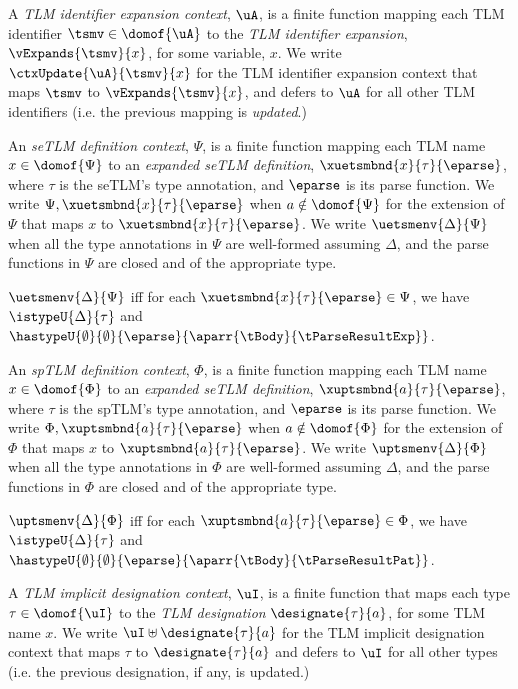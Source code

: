 A \emph{TLM identifier expansion context}, $\uA$, is a finite function mapping each TLM identifier $\tsmv \in \domof{\uA}$ to the \emph{TLM identifier expansion}, $\vExpands{\tsmv}{x}$, for some variable, $x$. We write $\ctxUpdate{\uA}{\tsmv}{x}$ for the TLM identifier expansion context that maps $\tsmv$ to $\vExpands{\tsmv}{x}$, and defers to $\uA$ for all other TLM identifiers (i.e. the previous mapping is \emph{updated}.)

An \emph{seTLM definition context}, $\Psi$, is a finite function mapping each TLM name $x \in \domof{\Psi}$ to an \emph{expanded seTLM definition}, $\xuetsmbnd{x}{\tau}{\eparse}$, where $\tau$ is the seTLM's type annotation, and $\eparse$ is its parse function. We write $\Psi, \xuetsmbnd{x}{\tau}{\eparse}$ when $a \notin \domof{\Psi}$ for the extension of $\Psi$ that maps $x$ to $\xuetsmbnd{x}{\tau}{\eparse}$. We write $\uetsmenv{\Delta}{\Psi}$  when all the type annotations in $\Psi$ are well-formed assuming $\Delta$, and the parse functions in $\Psi$ are closed and of the appropriate type.

\begin{definition}\label{def:seTLM-def-ctx-formation-B} $\uetsmenv{\Delta}{\Psi}$ iff for each $\xuetsmbnd{x}{\tau}{\eparse} \in \Psi$, we have $\istypeU{\Delta}{\tau}$ and $\hastypeU{\emptyset}{\emptyset}{\eparse}{\aparr{\tBody}{\tParseResultExp}}$.\end{definition}

An \emph{spTLM definition context}, $\Phi$, is a finite function mapping each TLM name $x \in \domof{\Phi}$ to an \emph{expanded seTLM definition}, $\xuptsmbnd{a}{\tau}{\eparse}$, where $\tau$ is the spTLM's type annotation, and $\eparse$ is its parse function. We write $\Phi, \xuptsmbnd{a}{\tau}{\eparse}$ when $a \notin \domof{\Phi}$ for the extension of $\Phi$ that maps $x$ to $\xuptsmbnd{a}{\tau}{\eparse}$. We write $\uptsmenv{\Delta}{\Phi}$  when all the type annotations in $\Phi$ are well-formed assuming $\Delta$, and the parse functions in $\Phi$ are closed and of the appropriate type.

\begin{definition}\label{def:spTLM-def-ctx-formation-B} $\uptsmenv{\Delta}{\Phi}$ iff for each $\xuptsmbnd{a}{\tau}{\eparse} \in \Phi$, we have $\istypeU{\Delta}{\tau}$ and $\hastypeU{\emptyset}{\emptyset}{\eparse}{\aparr{\tBody}{\tParseResultPat}}$.\end{definition}

A \emph{TLM implicit designation context}, $\uI$, is a finite function that maps each type $\tau \in \domof{\uI}$ to the \emph{TLM designation} $\designate{\tau}{a}$, for some TLM name $x$. We write $\uI \uplus \designate{\tau}{a}$ for the TLM implicit designation context that maps $\tau$ to $\designate{\tau}{a}$ and defers to $\uI$ for all other types (i.e. the previous designation, if any, is updated.)

